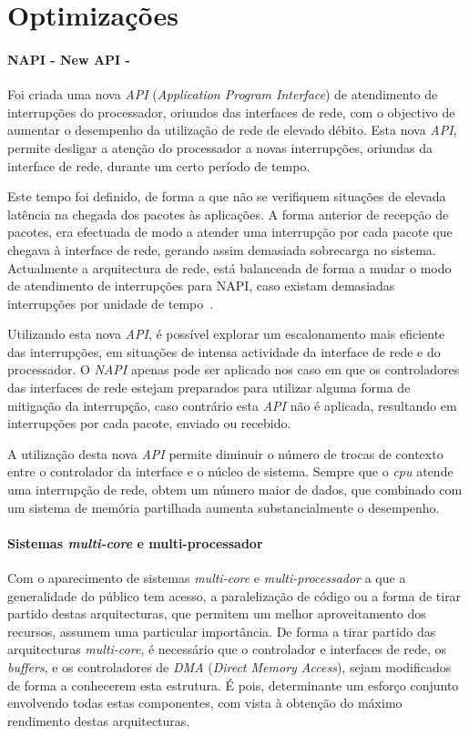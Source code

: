 \section{Optimizações}

\paragraph*{NAPI - New API - }

Foi criada uma nova \textit{API} (\textit{Application Program Interface}) de atendimento de interrupções do processador, oriundos das interfaces de rede, com o objectivo de aumentar o desempenho da utilização de rede de elevado débito.
Esta nova \textit{API}, permite desligar a atenção do processador a novas interrupções, oriundas da interface de rede, durante um certo período de tempo.

Este tempo foi definido, de forma a que não se verifiquem situações de elevada latência na chegada dos pacotes às aplicações.
A forma anterior de recepção de pacotes, era efectuada de modo a atender uma interrupção por cada pacote que chegava à interface de rede, gerando assim demasiada sobrecarga no sistema.
Actualmente a arquitectura de rede, está balanceada de forma a mudar o modo de atendimento de interrupções para NAPI, caso existam demasiadas interrupções por unidade de tempo~\cite{administrator:napi}.

Utilizando esta nova \textit{API}, é possível explorar um escalonamento mais eficiente das interrupções, em situações de intensa actividade da interface de rede e do processador.
O \textit{NAPI} apenas pode ser aplicado nos caso em que os controladores das interfaces de rede estejam preparados para utilizar alguma forma de mitigação da interrupção, caso contrário esta \textit{API} não é aplicada, resultando em interrupções por cada pacote, enviado ou recebido.

A utilização desta nova \textit{API} permite diminuir o número de trocas de contexto entre o controlador da interface e o núcleo de sistema.
Sempre que o \textit{cpu} atende uma interrupção de rede, obtem um número maior de dados, que combinado com um sistema de memória partilhada aumenta substancialmente o desempenho.


\paragraph*{Sistemas \textit{multi-core} e multi-processador}

Com o aparecimento de sistemas \textit{multi-core} e \textit{multi-processador} a que a generalidade do público tem acesso, a paralelização de código ou a forma de tirar partido destas arquitecturas, que permitem um melhor aproveitamento dos recursos, assumem uma particular importância.
De forma a tirar partido das arquitecturas \textit{multi-core}, é necessário que o controlador e interfaces de rede, os \textit{buffers}, e os controladores de \textit{DMA} (\textit{Direct Memory Access}), sejam modificados de forma a conhecerem esta estrutura.
É pois, determinante um esforço conjunto envolvendo todas estas componentes, com vista à obtenção do máximo rendimento destas arquitecturas\cite{Deri:2010}.



